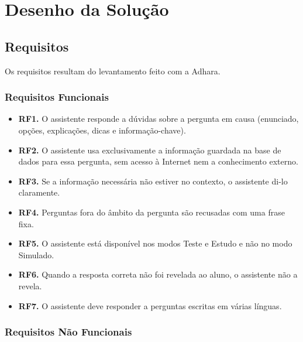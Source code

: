 
\chapter{Desenho da Solução} %
\label{chap:Chapter3} %

\section{Requisitos}
\label{sec:chap3_requirements}

Os requisitos resultam do levantamento feito com a Adhara. %

\subsection{Requisitos Funcionais}

\begin{itemize}
    \item \textbf{RF1.} O assistente responde a dúvidas sobre a pergunta em causa (enunciado, opções, explicações, dicas e informação-chave).
    \item \textbf{RF2.} O assistente usa exclusivamente a informação guardada na base de dados para essa pergunta, sem acesso à Internet nem a conhecimento externo.
    \item \textbf{RF3.} Se a informação necessária não estiver no contexto, o assistente di-lo claramente.
    \item \textbf{RF4.} Perguntas fora do âmbito da pergunta são recusadas com uma frase fixa.
    \item \textbf{RF5.} O assistente está disponível nos modos Teste e Estudo e não no modo Simulado.
    \item \textbf{RF6.} Quando a resposta correta não foi revelada ao aluno, o assistente não a revela.
    \item \textbf{RF7.} O assistente deve responder a perguntas escritas em várias línguas. %
\end{itemize}

\subsection{Requisitos Não Funcionais}


